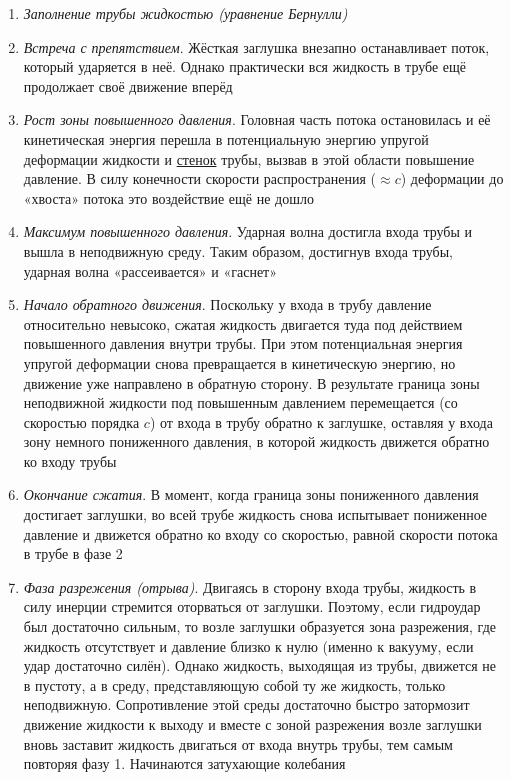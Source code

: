 \documentclass[a4paper, 14pt]{article}
\begin{document}
    \begin{enumerate}
        \item \textit{Заполнение трубы жидкостью (уравнение Бернулли)}

        \item \textit{Встреча с препятствием}.
        Жёсткая заглушка внезапно останавливает поток, который ударяется в неё.
        Однако практически вся жидкость в трубе ещё продолжает своё движение вперёд

        \item \textit{Рост зоны повышенного давления}.
        Головная часть потока остановилась и её кинетическая энергия перешла в потенциальную энергию упругой
        деформации жидкости и \uline{стенок} трубы, вызвав в этой области повышение давление.
        В силу конечности скорости распространения ($\approx c$) деформации до «хвоста» потока это воздействие ещё не
        дошло

        \item \textit{Максимум повышенного давления}.
        Ударная волна достигла входа трубы и вышла в неподвижную среду.
        Таким образом, достигнув входа трубы, ударная волна «рассеивается» и «гаснет»

        \item \textit{Начало обратного движения}.
        Поскольку у входа в трубу давление относительно невысоко, сжатая жидкость двигается туда под действием
        повышенного давления внутри трубы.
        При этом потенциальная энергия упругой деформации снова превращается в кинетическую энергию, но движение уже
        направлено в обратную сторону.
        В результате граница зоны неподвижной жидкости под повышенным давлением перемещается (со скоростью порядка $c$)
        от входа в трубу обратно к заглушке, оставляя у входа зону немного пониженного давления, в которой жидкость
        движется обратно ко входу трубы

        \item \textit{Окончание сжатия}.
        В момент, когда граница зоны пониженного давления достигает заглушки, во всей трубе жидкость снова испытывает
        пониженное давление и движется обратно ко входу со скоростью, равной скорости потока в трубе в фазе 2

        \item \textit{Фаза разрежения (отрыва)}.
        Двигаясь в сторону входа трубы, жидкость в силу инерции стремится оторваться от заглушки.
        Поэтому, если гидроудар был достаточно сильным, то возле заглушки образуется зона разрежения, где жидкость
        отсутствует и давление близко к нулю (именно к вакууму, если удар достаточно силён).
        Однако жидкость, выходящая из трубы, движется не в пустоту, а в среду, представляющую собой ту же жидкость,
        только неподвижную.
        Сопротивление этой среды достаточно быстро затормозит движение жидкости к выходу и вместе с зоной разрежения
        возле заглушки вновь заставит жидкость двигаться от входа внутрь трубы, тем самым повторяя фазу 1.
        Начинаются затухающие колебания

    \end{enumerate}
\end{document}
